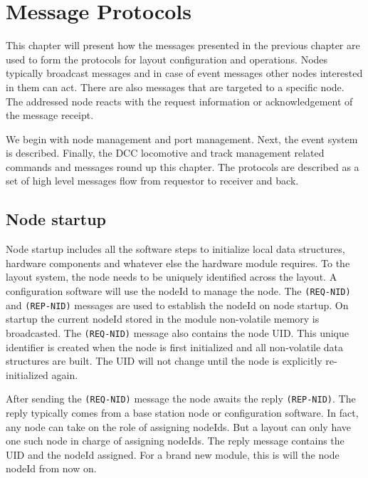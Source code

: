 \chapter{Message Protocols}

This chapter will present how the messages presented in the previous chapter are used to form the protocols for layout configuration and operations. Nodes typically broadcast messages and in case of event messages other nodes interested in them can act. There are also messages that are targeted to a specific node. The addressed node reacts with the request information or acknowledgement of the message receipt.

We begin with node management and port management. Next, the event system is described. Finally, the DCC locomotive and track management related commands and messages round up this chapter. The protocols are described as a set of high level messages flow from requestor to receiver and back.

\section{Node startup}

Node startup includes all the software steps to initialize local data structures, hardware components and whatever else the hardware module requires. To the layout system, the node needs to be uniquely identified across the layout. A configuration software will use the nodeId to manage the node. The \texttt{(REQ-NID)} and \texttt{(REP-NID)} messages are used to establish the nodeId on node startup. On startup the current nodeId stored in the module non-volatile memory is broadcasted. The \texttt{(REQ-NID)} message also contains the node UID. This unique identifier is created when the node is first initialized and all non-volatile data structures are built. The UID will not change until the node is explicitly re-initialized again.

After sending the \texttt{(REQ-NID)} message the node awaits the reply \texttt{(REP-NID)}. The reply typically comes from a base station node or configuration software. In fact, any node can take on the role of assigning nodeIds. But a layout can only have one such node in charge of assigning nodeIds. The reply message contains the UID and the nodeId assigned. For a brand new module, this is will the node nodeId from now on.

